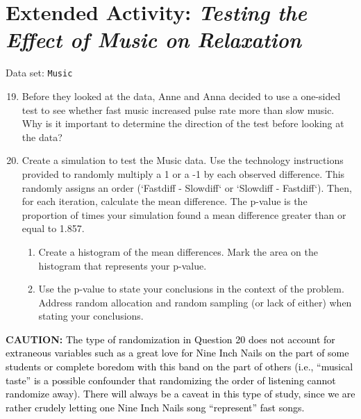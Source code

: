 \documentclass[
]{report}
\theoremstyle{definition}
\theoremstyle{definition}
\theoremstyle{definition}
\theoremstyle{definition}
\theoremstyle{remark}
\begin{document}
\hypertarget{extended-activity-testing-the-effect-of-music-on-relaxation}{%
\section*{\texorpdfstring{Extended Activity: \emph{Testing the Effect of Music on Relaxation}}{Extended Activity: Testing the Effect of Music on Relaxation}}\label{extended-activity-testing-the-effect-of-music-on-relaxation}}

Data set: \texttt{Music}

\begin{enumerate}
  \setcounter{enumi}{18}  %

  \item Before they looked at the data, Anne and Anna decided to use a one-sided test to see whether fast
  music increased pulse rate more than slow music. Why is it important to determine the direction of the
  test before looking at the data?

  \item Create a simulation to test the Music data. Use the technology instructions provided to randomly
  multiply a 1 or a -1 by each observed difference. This randomly assigns an order (`Fastdiff -
  Slowdiff` or `Slowdiff - Fastdiff`). Then, for each iteration, calculate the mean difference. The
  p-value is the proportion of times your simulation found a mean difference greater than or equal to
  1.857.
  \begin{enumerate}
    \item Create a histogram of the mean differences. Mark the area on the histogram that represents your p-value.

    \item Use the p-value to state your conclusions in the context of the problem. Address random allocation
    and random sampling (or lack of either) when stating your conclusions.
  \end{enumerate}
\end{enumerate}

\large

\textbf{CAUTION:}
\textcolor{black}{The type of randomization in Question 20 does not account for extraneous variables such as a great love
for Nine Inch Nails on the part of some students or complete boredom with this band on the part of others
(i.e., “musical taste” is a possible confounder that randomizing the order of listening cannot randomize
away). There will always be a caveat in this type of study, since we are rather crudely letting one Nine
Inch Nails song “represent” fast songs.}
\end{document}
